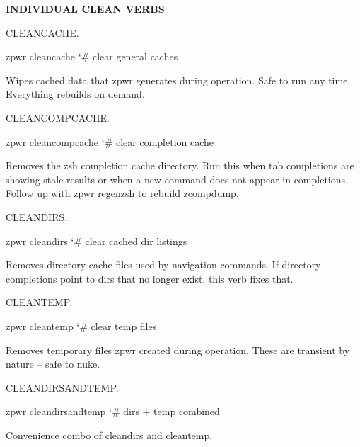 \documentclass[11pt,a4paper,twoside]{book}
\begin{document}
\vspace{12pt}
{\bfseries\color{neonyellow} INDIVIDUAL CLEAN VERBS}\vspace{4pt}

CLEANCACHE.

\begin{codebox}
\color{neongreen}zpwr cleancache                     {\char`\#} clear general caches\\
\end{codebox}

Wipes cached data that zpwr generates during operation. Safe to run any time. Everything rebuilds on demand.

CLEANCOMPCACHE.

\begin{codebox}
\color{neongreen}zpwr cleancompcache                 {\char`\#} clear completion cache\\
\end{codebox}

Removes the zsh completion cache directory. Run this when tab completions are showing stale results or when a new command does not appear in completions. Follow up with zpwr regenzsh to rebuild zcompdump.

CLEANDIRS.

\begin{codebox}
\color{neongreen}zpwr cleandirs                      {\char`\#} clear cached dir listings\\
\end{codebox}

Removes directory cache files used by navigation commands. If directory completions point to dirs that no longer exist, this verb fixes that.

CLEANTEMP.

\begin{codebox}
\color{neongreen}zpwr cleantemp                      {\char`\#} clear temp files\\
\end{codebox}

Removes temporary files zpwr created during operation. These are transient by nature -- safe to nuke.

CLEANDIRSANDTEMP.

\begin{codebox}
\color{neongreen}zpwr cleandirsandtemp               {\char`\#} dirs + temp combined\\
\end{codebox}

Convenience combo of cleandirs and cleantemp.
\end{document}
